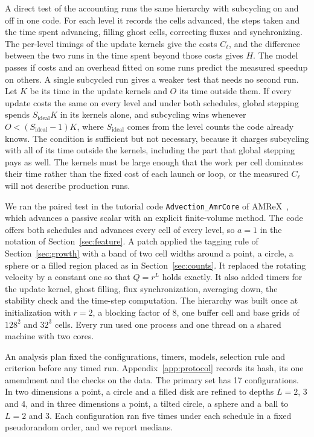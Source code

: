 \documentclass[12pt]{article}
\theoremstyle{remark}
\newcommand{\Sid}{S_{\mathrm{ideal}}}
\begin{document}
A direct test of the accounting runs the same hierarchy with subcycling on and off in one code. For each level it records the cells advanced, the steps taken and the time spent advancing, filling ghost cells, correcting fluxes and synchronizing. The per-level timings of the update kernels give the costs $C_\ell$, and the difference between the two runs in the time spent beyond those costs gives $H$. The model passes if costs and an overhead fitted on some runs predict the measured speedup on others. A single subcycled run gives a weaker test that needs no second run. Let $K$ be its time in the update kernels and $O$ its time outside them. If every update costs the same on every level and under both schedules, global stepping spends $\Sid K$ in its kernels alone, and subcycling wins whenever $O<(\Sid-1)K$, where $\Sid$ comes from the level counts the code already knows. The condition is sufficient but not necessary, because it charges subcycling with all of its time outside the kernels, including the part that global stepping pays as well. The kernels must be large enough that the work per cell dominates their time rather than the fixed cost of each launch or loop, or the measured $C_\ell$ will not describe production runs.

We ran the paired test in the tutorial code \texttt{Advection\_AmrCore} of AMReX~\cite{zhang2019amrex}, which advances a passive scalar with an explicit finite-volume method. The code offers both schedules and advances every cell of every level, so $a=1$ in the notation of Section~\ref{sec:feature}. A patch applied the tagging rule of Section~\ref{sec:growth} with a band of two cell widths around a point, a circle, a sphere or a filled region placed as in Section~\ref{sec:counts}. It replaced the rotating velocity by a constant one so that $Q=r^L$ holds exactly. It also added timers for the update kernel, ghost filling, flux synchronization, averaging down, the stability check and the time-step computation. The hierarchy was built once at initialization with $r=2$, a blocking factor of 8, one buffer cell and base grids of $128^2$ and $32^3$ cells. Every run used one process and one thread on a shared machine with two cores.

An analysis plan fixed the configurations, timers, models, selection rule and criterion before any timed run. Appendix~\ref{app:protocol} records its hash, its one amendment and the checks on the data. The primary set has 17 configurations. In two dimensions a point, a circle and a filled disk are refined to depths $L=2$, 3 and 4, and in three dimensions a point, a tilted circle, a sphere and a ball to $L=2$ and 3. Each configuration ran five times under each schedule in a fixed pseudorandom order, and we report medians.
\end{document}
